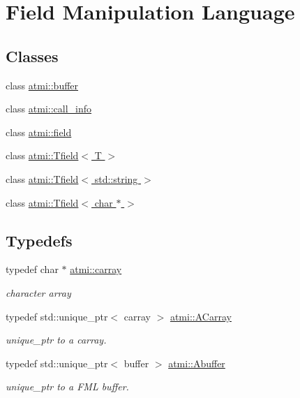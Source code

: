 \hypertarget{group__fml}{\section{Field Manipulation Language}
\label{group__fml}
}
\subsection*{Classes}
\begin{DoxyCompactItemize}
\item 
class \hyperlink{classatmi_1_1buffer}{atmi\+::buffer}
\item 
class \hyperlink{classatmi_1_1call__info}{atmi\+::call\+\_\+info}
\item 
class \hyperlink{classatmi_1_1field}{atmi\+::field}
\item 
class \hyperlink{classatmi_1_1_tfield}{atmi\+::\+Tfield$<$ T $>$}
\item 
class \hyperlink{classatmi_1_1_tfield_3_01std_1_1string_01_4}{atmi\+::\+Tfield$<$ std\+::string $>$}
\item 
class \hyperlink{classatmi_1_1_tfield_3_01char_01_5_01_4}{atmi\+::\+Tfield$<$ char $\ast$ $>$}
\end{DoxyCompactItemize}
\subsection*{Typedefs}
\begin{DoxyCompactItemize}
\item 
\hypertarget{group__fml_ga8b57f9a4e2453d8e5d82ac0016e35e87}{typedef char $\ast$ \hyperlink{group__fml_ga8b57f9a4e2453d8e5d82ac0016e35e87}{atmi\+::carray}}\label{group__fml_ga8b57f9a4e2453d8e5d82ac0016e35e87}

\begin{DoxyCompactList}\small\item\em character array \end{DoxyCompactList}\item 
\hypertarget{group__fml_ga095330dfead97321f0830e3fa204a24a}{typedef std\+::unique\+\_\+ptr$<$ carray $>$ \hyperlink{group__fml_ga095330dfead97321f0830e3fa204a24a}{atmi\+::\+A\+Carray}}\label{group__fml_ga095330dfead97321f0830e3fa204a24a}

\begin{DoxyCompactList}\small\item\em unique\+\_\+ptr to a carray. \end{DoxyCompactList}\item 
\hypertarget{group__fml_gaa6276ba0b9cf18dd00fae53b1ce132f4}{typedef std\+::unique\+\_\+ptr$<$ buffer $>$ \hyperlink{group__fml_gaa6276ba0b9cf18dd00fae53b1ce132f4}{atmi\+::\+Abuffer}}\label{group__fml_gaa6276ba0b9cf18dd00fae53b1ce132f4}

\begin{DoxyCompactList}\small\item\em unique\+\_\+ptr to a F\+M\+L buffer. \end{DoxyCompactList}\end{DoxyCompactItemize}
